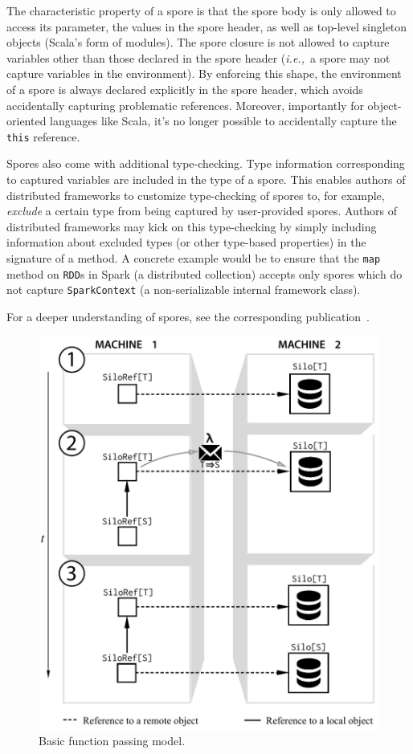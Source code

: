 \documentclass[10pt]{sigplanconf}
\theoremstyle{definition}
\theoremstyle{definition}
\newcommand{\ie}{{\em i.e.,~}}
\begin{document}
The characteristic property of a spore is that the spore body is only allowed
to access its parameter, the values in the spore header, as well as top-level
singleton objects (Scala's form of modules). The spore closure is not allowed
to capture variables other than those declared in the spore header (\ie a spore
may not capture variables in the environment). By enforcing this shape, the
environment of a spore is always declared explicitly in the spore header, which
avoids accidentally capturing problematic references. Moreover, importantly for
object-oriented languages like Scala, it's no longer possible to accidentally
capture the \verb|this| reference.

Spores also come with additional type-checking. Type information corresponding
to captured variables are included in the type of a spore. This enables authors
of distributed frameworks to customize type-checking of spores to, for example,
{\em exclude} a certain type from being captured by user-provided spores.
Authors of distributed frameworks may kick on this type-checking by simply
including information about excluded types (or other type-based properties) in
the signature of a method. A concrete example would be to ensure that the
\verb|map| method on \verb|RDD|s in Spark (a distributed collection) accepts
only spores which do not capture \verb|SparkContext| (a non-serializable
internal framework class).

For a deeper understanding of spores, see
the corresponding publication~\cite{Spores}.

\begin{figure}[t!]
\centering\includegraphics[width=0.8\columnwidth]{basic-diagram.pdf}
\caption{Basic function passing model.}\label{fig:basic-diagram}
\end{figure}
\end{document}
